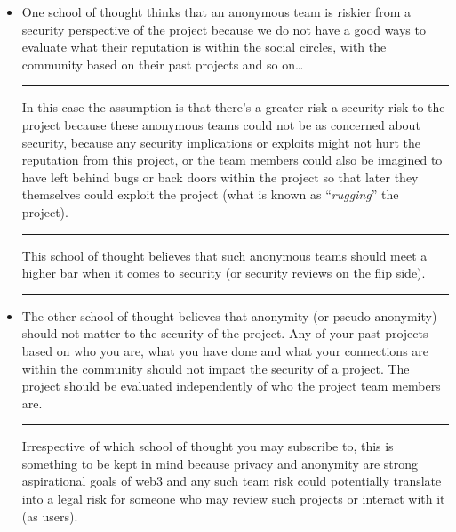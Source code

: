 \begin{itemize}
\item
  One school of thought thinks that an anonymous team is riskier from a
  security perspective of the project because we do not have a good ways
  to evaluate what their reputation is within the social circles, with
  the community based on their past projects and so on\ldots{}

  \begin{center}\rule{0.5\linewidth}{0.5pt}\end{center}

  In this case the assumption is that there's a greater risk a security
  risk to the project because these anonymous teams could not be as
  concerned about security, because any security implications or
  exploits might not hurt the reputation from this project, or the team
  members could also be imagined to have left behind bugs or back doors
  within the project so that later they themselves could exploit the
  project (what is known as ``\emph{rugging}'' the project).

  \begin{center}\rule{0.5\linewidth}{0.5pt}\end{center}

  This school of thought believes that such anonymous teams should meet
  a higher bar when it comes to security (or security reviews on the
  flip side).

  \begin{center}\rule{0.5\linewidth}{0.5pt}\end{center}
\item
  The other school of thought believes that anonymity (or
  pseudo-anonymity) should not matter to the security of the project.
  Any of your past projects based on who you are, what you have done and
  what your connections are within the community should not impact the
  security of a project. The project should be evaluated independently
  of who the project team members are.

  \begin{center}\rule{0.5\linewidth}{0.5pt}\end{center}

  Irrespective of which school of thought you may subscribe to, this is
  something to be kept in mind because privacy and anonymity are strong
  aspirational goals of web3 and any such team risk could potentially
  translate into a legal risk for someone who may review such projects
  or interact with it (as users).
\end{itemize}

